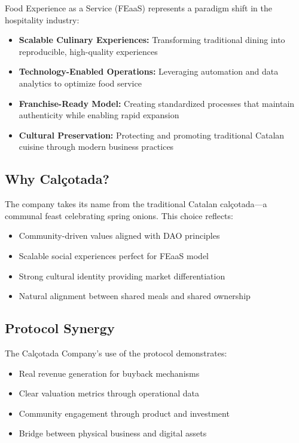 \documentclass[conference]{IEEEtran}
\begin{document}
Food Experience as a Service (FEaaS) represents a paradigm shift in the hospitality industry:

\begin{itemize}
    \item \textbf{Scalable Culinary Experiences:} Transforming traditional dining into reproducible, high-quality experiences
    \item \textbf{Technology-Enabled Operations:} Leveraging automation and data analytics to optimize food service
    \item \textbf{Franchise-Ready Model:} Creating standardized processes that maintain authenticity while enabling rapid expansion
    \item \textbf{Cultural Preservation:} Protecting and promoting traditional Catalan cuisine through modern business practices
\end{itemize}

\subsection{Why Calçotada?}

The company takes its name from the traditional Catalan calçotada—a communal feast celebrating spring onions. This choice reflects:
\begin{itemize}
    \item Community-driven values aligned with DAO principles
    \item Scalable social experiences perfect for FEaaS model
    \item Strong cultural identity providing market differentiation
    \item Natural alignment between shared meals and shared ownership
\end{itemize}

\subsection{Protocol Synergy}

The Calçotada Company's use of the protocol demonstrates:
\begin{itemize}
    \item Real revenue generation for buyback mechanisms
    \item Clear valuation metrics through operational data
    \item Community engagement through product and investment
    \item Bridge between physical business and digital assets
\end{itemize}
\end{document}
